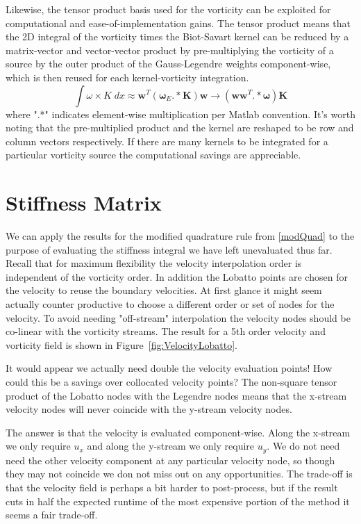 \documentclass[letterpaper,12pt]{report}
\newcommand{\be}{\begin{equation}}
\newcommand{\ee}{\end{equation}}
\begin{document}
Likewise, the tensor product basis used for the vorticity can be exploited for computational and ease-of-implementation gains. The tensor product means that the 2D integral of the vorticity times the Biot-Savart kernel can be reduced by a matrix-vector and vector-vector product by pre-multiplying the vorticity of a source by the outer product of the Gauss-Legendre weights component-wise, which is then reused for each kernel-vorticity integration.
\be \int \omega \times K \;dx \approx \boldsymbol{w}^T(\boldsymbol{\omega}_E.*\boldsymbol{K}) \boldsymbol{w} \rightarrow (\boldsymbol{ww}^T.*\boldsymbol{\omega})\boldsymbol{K} \ee
where ".*" indicates element-wise multiplication per Matlab convention. It's worth noting that the pre-multiplied product and the kernel are reshaped to be row and column vectors respectively. If there are many kernels to be integrated for a particular vorticity source the computational savings are appreciable.
%
\section{Stiffness Matrix}
We can apply the results for the modified quadrature rule from \eqref{modQuad} to the purpose of evaluating the stiffness integral we have left unevaluated thus far. Recall that for maximum flexibility the velocity interpolation order is independent of the vorticity order. In addition the Lobatto points are chosen for the velocity to reuse the boundary velocities. At first glance it might seem actually counter productive to choose a different order or set of nodes for the velocity. To avoid needing "off-stream" interpolation the velocity nodes should be co-linear with the vorticity streams. The result for a 5th order velocity and vorticity field is shown in Figure~\ref{fig:VelocityLobatto}.

It would appear we actually need double the velocity evaluation points! How could this be a savings over collocated velocity points? The non-square tensor product of the Lobatto nodes with the Legendre nodes means that the x-stream velocity nodes will never coincide with the y-stream velocity nodes.

The answer is that the velocity is evaluated component-wise. Along the x-stream we only require $u_x$ and along the y-stream we only require $u_y$. We do not need need the other velocity component at any particular velocity node, so though they may not coincide we don not miss out on any opportunities. The trade-off is that the velocity field is perhaps a bit harder to post-process, but if the result cuts in half the expected runtime of the most expensive portion of the method it seems a fair trade-off.
\end{document}
